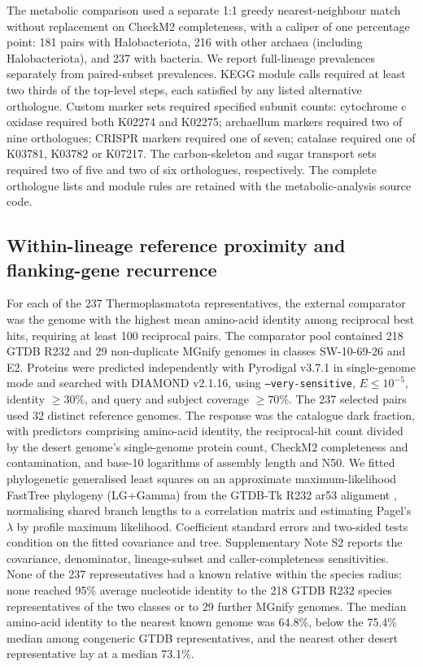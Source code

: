 The metabolic comparison used a separate 1:1 greedy nearest-neighbour match without replacement
on CheckM2 completeness, with a caliper of one percentage point: 181 pairs with Halobacteriota,
216 with other archaea (including Halobacteriota), and 237 with bacteria. We report full-lineage
prevalences separately from paired-subset prevalences. KEGG module calls required at least
two thirds of the top-level steps, each satisfied by any listed alternative orthologue.
Custom marker sets required specified subunit counts: cytochrome c oxidase required both
K02274 and K02275; archaellum markers required two of nine orthologues; CRISPR markers required
one of seven; catalase required one of K03781, K03782 or K07217. The carbon-skeleton and sugar
transport sets required two of five and two of six orthologues, respectively. The complete
orthologue lists and module rules are retained with the metabolic-analysis source code.

\subsection*{Within-lineage reference proximity and flanking-gene recurrence}
For each of the 237 Thermoplasmatota representatives, the external comparator was the genome
with the highest mean amino-acid identity among reciprocal best hits, requiring at least 100
reciprocal pairs. The comparator pool contained 218 GTDB R232 and 29 non-duplicate MGnify genomes
in classes SW-10-69-26 and E2. Proteins were predicted independently with Pyrodigal v3.7.1 in
single-genome mode and searched with DIAMOND v2.1.16, using \texttt{--very-sensitive},
$E\leq10^{-5}$, identity $\geq30\%$, and query and subject coverage $\geq70\%$.
The 237 selected pairs used 32 distinct reference genomes. The response was the catalogue dark
fraction, with predictors comprising amino-acid identity, the reciprocal-hit count divided by
the desert genome's single-genome protein count, CheckM2 completeness and contamination, and
base-10 logarithms of assembly length and N50. We fitted phylogenetic generalised least squares
on an approximate maximum-likelihood FastTree phylogeny (LG+Gamma) from the GTDB-Tk R232 ar53 alignment \citep{price2010fasttree}, normalising shared branch lengths to a correlation
matrix and estimating Pagel's $\lambda$ by profile maximum likelihood. Coefficient standard
errors and two-sided tests condition on the fitted covariance and tree. Supplementary Note S2
reports the covariance, denominator, lineage-subset and caller-completeness sensitivities.
None of the 237 representatives had a known relative within the species radius: none reached 95\% average nucleotide identity to the 218 GTDB R232 species representatives of the two classes or to 29 further MGnify genomes. The median amino-acid identity to the nearest known genome was 64.8\%, below the 75.4\% median among congeneric GTDB representatives, and the nearest other desert representative lay at a median 73.1\%.

